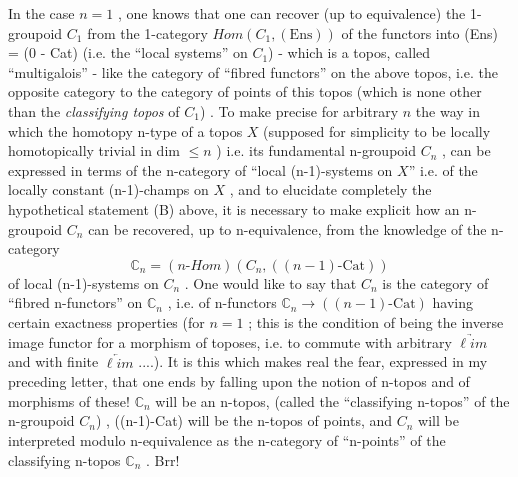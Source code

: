 
In the case $n = 1$ , one knows that one can recover (up to equivalence)
the 1-groupoid $C_1$ from the 1-category $\mathit{Hom}(C_1, (\mathrm{Ens}))$ of the functors into
(Ens) = (0 - Cat) (i.e. the ``local systems'' on $C_1$) - which is a topos, called
``multigalois'' - like the category of ``fibred functors'' on the above topos,
i.e. the opposite category to the category of points of this topos (which
is none other than the \textit{classifying topos} of $C_1$) . To make precise for
arbitrary $n$ the way in which the homotopy n-type of a topos $X$ (supposed
for simplicity to be locally homotopically trivial in dim $\leq n$ ) i.e. its
fundamental n-groupoid $C_n$ , can be expressed in terms of the n-category of
``local (n-1)-systems on $X$'' i.e. of the locally constant (n-1)-champs on $X$ ,
and to elucidate completely the hypothetical statement (B) above, it is
necessary to make explicit how an n-groupoid $C_n$ can be recovered, up to
n-equivalence, from the knowledge of the n-category
\[ \mathbb{C}_n = (n\text{-}\mathit{Hom})(C_n , ((n-1)\text{-}\mathrm{Cat})) \]
of local (n-1)-systems on $C_n$ . One would like to say that $C_n$ is the category
of ``fibred n-functors'' on $\mathbb{C}_n$ , i.e. of n-functors $\mathbb{C}_n \rightarrow ((n-1)\text{-}\mathrm{Cat})$ having
certain exactness properties (for $n = 1$ ; this is the condition of being
the inverse image functor for a morphism of toposes, i.e. to commute with
arbitrary $\underrightarrow{\ell im}$ and with finite $\underleftarrow{\ell im}$ ....). It is this which makes real
the fear, expressed in my preceding letter, that one ends by falling upon
the notion of n-topos and of morphisms of these! $\mathbb{C}_n$ will be an n-topos,
(called the ``classifying n-topos'' of the n-groupoid $C_n$) , ((n-1)-Cat) will
be the n-topos of points, and $C_n$ will be interpreted modulo n-equivalence
as the n-category of ``n-points'' of the classifying n-topos $\mathbb{C}_n$ . Brr!

